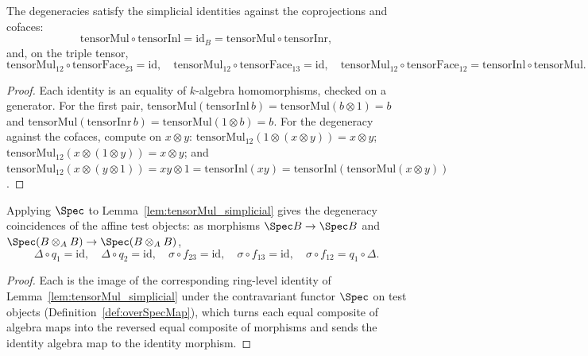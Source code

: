 \begin{lemma}
  \label{lem:tensorMul_simplicial}
  \leanok
  The degeneracies satisfy the simplicial identities against the coprojections and cofaces:
  \[
    \mathrm{tensorMul} \circ \mathrm{tensorInl} = \mathrm{id}_B
      = \mathrm{tensorMul} \circ \mathrm{tensorInr} ,
  \]
  and, on the triple tensor,
  \[
    \mathrm{tensorMul}_{12} \circ \mathrm{tensorFace}_{23} = \mathrm{id}, \quad
    \mathrm{tensorMul}_{12} \circ \mathrm{tensorFace}_{13} = \mathrm{id}, \quad
    \mathrm{tensorMul}_{12} \circ \mathrm{tensorFace}_{12}
      = \mathrm{tensorInl} \circ \mathrm{tensorMul} .
  \]
\end{lemma}
\begin{proof}
  \leanok
  Each identity is an equality of \(k\)-algebra homomorphisms, checked on a generator. For the
  first pair, \(\mathrm{tensorMul}(\mathrm{tensorInl}\,b) = \mathrm{tensorMul}(b \otimes 1) = b\)
  and \(\mathrm{tensorMul}(\mathrm{tensorInr}\,b) = \mathrm{tensorMul}(1 \otimes b) = b\). For
  the degeneracy against the cofaces, compute on \(x \otimes y\): \(\mathrm{tensorMul}_{12}(1
  \otimes (x \otimes y)) = x \otimes y\); \(\mathrm{tensorMul}_{12}(x \otimes (1 \otimes y)) =
  x \otimes y\); and \(\mathrm{tensorMul}_{12}(x \otimes (y \otimes 1)) = xy \otimes 1 =
  \mathrm{tensorInl}(xy) = \mathrm{tensorInl}(\mathrm{tensorMul}(x \otimes y))\).
\end{proof}

\begin{lemma}
  \label{lem:overSpecMap_left_degeneracy}
  \leanok
  Applying \(\Spec\) to Lemma~\ref{lem:tensorMul_simplicial} gives the degeneracy coincidences
  of the affine test objects: as morphisms \(\Spec B \to \Spec B\) and
  \(\Spec(B \otimes_A B) \to \Spec(B \otimes_A B)\),
  \[
    \Delta \circ q_1 = \mathrm{id}, \quad \Delta \circ q_2 = \mathrm{id}, \quad
    \sigma \circ f_{23} = \mathrm{id}, \quad \sigma \circ f_{13} = \mathrm{id}, \quad
    \sigma \circ f_{12} = q_1 \circ \Delta .
  \]
\end{lemma}
\begin{proof}
  \leanok
  Each is the image of the corresponding ring-level identity of
  Lemma~\ref{lem:tensorMul_simplicial} under the contravariant functor \(\Spec\) on test
  objects (Definition~\ref{def:overSpecMap}), which turns each equal composite of algebra maps
  into the reversed equal composite of morphisms and sends the identity algebra map to the
  identity morphism.
\end{proof}

